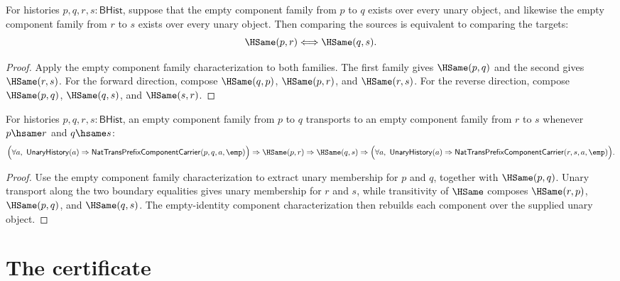 \begin{theorem}
\label{thm:yoneda-representable-empty-component-family-boundary-hsame-iff}
For histories $p,q,r,s:\mathsf{BHist}$, suppose that the empty component
family from $p$ to $q$ exists over every unary object, and likewise the empty
component family from $r$ to $s$ exists over every unary object. Then comparing
the sources is equivalent to comparing the targets:
$$
\HSame(p,r)\Longleftrightarrow\HSame(q,s).
$$
\end{theorem}
\begin{proof}
Apply the empty component family characterization to both families. The first
family gives $\HSame(p,q)$ and the second gives $\HSame(r,s)$. For the forward
direction, compose $\HSame(q,p)$, $\HSame(p,r)$, and $\HSame(r,s)$. For the
reverse direction, compose $\HSame(p,q)$, $\HSame(q,s)$, and $\HSame(s,r)$.
\end{proof}

\begin{theorem}
\label{thm:yoneda-empty-component-family-boundary-transport}
For histories $p,q,r,s:\mathsf{BHist}$, an empty component family from $p$ to
$q$ transports to an empty component family from $r$ to $s$ whenever
$p\hsame r$ and $q\hsame s$:
$$
\Bigl(\forall a,\ \mathsf{UnaryHistory}(a)\Rightarrow
\mathsf{NatTransPrefixComponentCarrier}(p,q,a,\emp)\Bigr)
\Rightarrow
\HSame(p,r)\Rightarrow\HSame(q,s)\Rightarrow
\Bigl(\forall a,\ \mathsf{UnaryHistory}(a)\Rightarrow
\mathsf{NatTransPrefixComponentCarrier}(r,s,a,\emp)\Bigr).
$$
\end{theorem}
\begin{proof}
Use the empty component family characterization to extract unary membership
for $p$ and $q$, together with $\HSame(p,q)$. Unary transport along the two
boundary equalities gives unary membership for $r$ and $s$, while transitivity
of $\HSame$ composes $\HSame(r,p)$, $\HSame(p,q)$, and $\HSame(q,s)$. The
empty-identity component characterization then rebuilds each component over
the supplied unary object.
\end{proof}

\section{The certificate}
\label{sec:yoneda-certificate}


